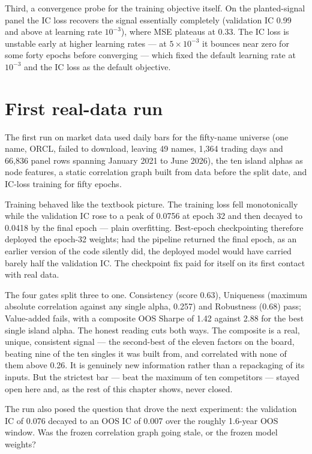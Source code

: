 Third, a convergence probe for the training objective itself. On the
planted-signal panel the IC loss recovers the signal essentially
completely (validation IC 0.99 and above at learning rate $10^{-3}$),
where MSE plateaus at 0.33. The IC loss is unstable early at higher
learning rates --- at $5\times10^{-3}$ it bounces near zero for some forty
epochs before converging --- which fixed the default learning rate at
$10^{-3}$ and the IC loss as the default objective.

\section{First real-data run}
\label{sec:eq-first}

The first run on market data used daily bars for the fifty-name universe
(one name, ORCL, failed to download, leaving 49 names, 1{,}364 trading
days and 66{,}836 panel rows spanning January 2021 to June 2026), the ten
island alphas as node features, a static correlation graph built from
data before the split date, and IC-loss training for fifty epochs.

Training behaved like the textbook picture. The training loss fell
monotonically while the validation IC rose to a peak of 0.0756 at epoch
32 and then decayed to 0.0418 by the final epoch --- plain overfitting.
Best-epoch checkpointing therefore deployed the epoch-32 weights; had the
pipeline returned the final epoch, as an earlier version of the code
silently did, the deployed model would have carried barely half the
validation IC. The checkpoint fix paid for itself on its first contact
with real data.

The four gates split three to one. Consistency (score 0.63), Uniqueness
(maximum absolute correlation against any single alpha, 0.257) and
Robustness (0.68) pass; Value-added fails, with a composite OOS Sharpe of
1.42 against 2.88 for the best single island alpha. The honest reading
cuts both ways. The composite is a real, unique, consistent signal ---
the second-best of the eleven factors on the board, beating nine of the
ten singles it was built from, and correlated with none of them above
0.26. It is genuinely new information rather than a repackaging of its
inputs. But the strictest bar --- beat the maximum of ten competitors ---
stayed open here and, as the rest of this chapter shows, never closed.

The run also posed the question that drove the next experiment: the
validation IC of 0.076 decayed to an OOS IC of 0.007 over the roughly
1.6-year OOS window. Was the frozen correlation graph going stale, or the
frozen model weights?

